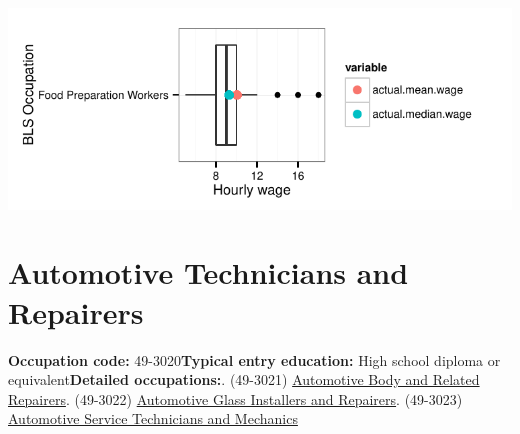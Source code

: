 \documentclass[a4paper,10pt]{article}\usepackage[]{graphicx}\usepackage[]{color}
\makeatletter
\def\maxwidth{ %
  \ifdim\Gin@nat@width>\linewidth
    \linewidth
  \else
    \Gin@nat@width
  \fi
}
\makeatother
\begin{document}
{\centering \includegraphics[width=\maxwidth]{figure/unnamed-chunk-237} 

}


\newpage\section{Automotive Technicians and Repairers}\textbf{Occupation code:} 49-3020\newline\textbf{Typical entry education:} High school diploma or equivalent\newline\textbf{Detailed occupations:}. (49-3021)  \href{http://www.bls.gov/oes/current/oes493021.htm}{Automotive Body and Related Repairers}. (49-3022)  \href{http://www.bls.gov/oes/current/oes493022.htm}{Automotive Glass Installers and Repairers}. (49-3023)  \href{http://www.bls.gov/oes/current/oes493023.htm}{Automotive Service Technicians and Mechanics}\newline%
\end{document}

